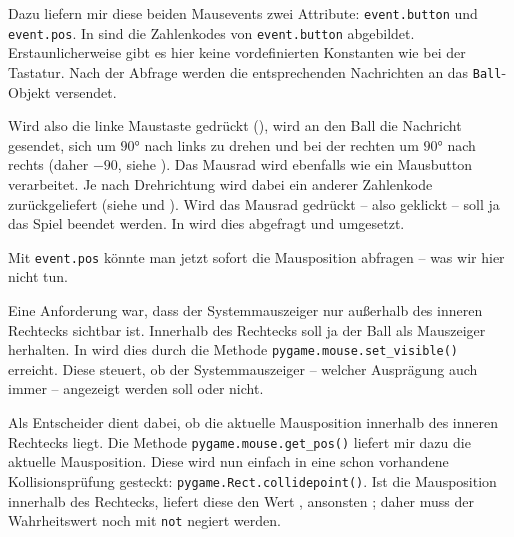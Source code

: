 Dazu liefern mir diese beiden Mausevents zwei Attribute: \texttt{event.button} und \texttt{event.pos}. In  sind die Zahlenkodes von \texttt{event.button} abgebildet. Erstaunlicherweise gibt es hier keine vordefinierten Konstanten wie bei der Tastatur. Nach der Abfrage werden die entsprechenden Nachrichten an das \texttt{Ball}-Objekt versendet.

Wird also die linke Maustaste gedrückt (), wird an den Ball die Nachricht gesendet, sich um $90°$ nach links zu drehen und bei der rechten um $90°$ nach rechts (daher $-90$, siehe ). Das Mausrad wird ebenfalls wie ein Mausbutton verarbeitet. Je nach Drehrichtung wird dabei ein anderer Zahlenkode zurückgeliefert (siehe  und ). Wird das Mausrad gedrückt -- also geklickt -- soll ja das Spiel beendet werden. In  wird dies abgefragt und umgesetzt.

Mit \texttt{event.pos} könnte man jetzt sofort die Mausposition abfragen -- was wir hier nicht tun.


Eine Anforderung war, dass der Systemmauszeiger nur außerhalb des inneren Rechtecks sichtbar ist. Innerhalb des Rechtecks soll ja der Ball als Mauszeiger herhalten. In  wird dies durch die Methode \texttt{\texttt{pygame.mouse.set\_visible()}} erreicht. Diese steuert, ob der Systemmauszeiger -- welcher Ausprägung auch immer -- angezeigt werden soll oder nicht. 

Als Entscheider dient dabei, ob die aktuelle Mausposition innerhalb des inneren Rechtecks liegt. Die Methode \texttt{pygame.mouse.get\_pos()} liefert mir dazu die aktuelle Mausposition. Diese wird nun einfach in eine schon vorhandene Kollisionsprüfung gesteckt: \texttt{pygame.Rect.collidepoint()}. Ist die Mausposition innerhalb des Rechtecks, liefert diese den Wert \true, ansonsten \false; daher muss der Wahrheitswert noch mit \texttt{not} negiert werden.

